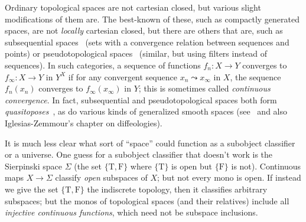 \documentclass[12pt]{article}
\def\oo{\ensuremath{\infty}}
\def\true{\mathrm{T}}
\def\false{\mathrm{F}}
\numberwithin{equation}{section}
\begin{document}
Ordinary topological spaces are not cartesian closed, but various slight modifications of them are.
The best-known of these, such as compactly generated spaces, are not \emph{locally} cartesian closed,
but there are others that are, such as subsequential spaces~\cite{ptj:topological-topos} (sets with a convergence relation between sequences and points) or pseudotopological spaces~\cite{choquet:convergences,wyler:topoi-in-topology} (similar, but using filters instead of sequences).
In such categories, %
a sequence of functions $f_n:X\to Y$ converges to $f_\oo:X\to Y$ in $Y^X$ if for any convergent sequence $x_n \leadsto x_\oo$ in $X$, the sequence $f_n(x_n)$ converges to $f_\oo(x_\oo)$ in $Y$; this is sometimes called \emph{continuous convergence}.
In fact, subsequential and pseudotopological spaces both form \emph{quasitoposes}~\cite{wyler:quasitopoi}, as do various kinds of generalized smooth spaces (see~\cite{bh:cc-smooth} and also Iglesias-Zemmour's chapter on diffeologies).


It is much less clear what sort of ``space'' could function as a subobject classifier or a universe.
One guess for a subobject classifier that doesn't work is the Sierpinski space $\Sigma$ (the set $\{\true,\false\}$ where $\{\true\}$ is open but $\{\false\}$ is not).
Continuous maps $X\to \Sigma$ classify \emph{open} subspaces of $X$; but not every mono is open. %
If instead we give the set $\{\true,\false\}$ the indiscrete topology, then it classifies arbitrary subspaces; but the monos of topological spaces (and their relatives) include all \emph{injective continuous functions}, which need not be subspace inclusions.
\end{document}
